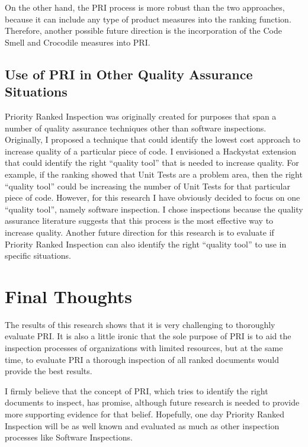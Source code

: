 On the other hand, the PRI process is more robust than the two approaches,
because it can include any type of product measures into the ranking
function. Therefore, another possible future direction is the incorporation
of the Code Smell and Crocodile measures into PRI.


\subsection{Use of PRI in Other Quality Assurance Situations}
Priority Ranked Inspection was originally created for purposes that span a
number of quality assurance techniques other than software inspections.
Originally, I proposed a technique that could identify the lowest cost
approach to increase quality of a particular piece of code. I envisioned a
Hackystat extension that could identify the right ``quality tool'' that is
needed to increase quality. For example, if the ranking showed that Unit
Tests are a problem area, then the right ``quality tool'' could be
increasing the number of Unit Tests for that particular piece of code.
However, for this research I have obviously decided to focus on one
``quality tool'', namely software inspection. I chose inspections because
the quality assurance literature suggests that this process is the most
effective way to increase quality. Another future direction for this
research is to evaluate if Priority Ranked Inspection can also identify the
right ``quality tool'' to use in specific situations.


\section{Final Thoughts}
The results of this research shows that it is very challenging to
thoroughly evaluate PRI. It is also a little ironic that the sole purpose
of PRI is to aid the inspection processes of organizations with limited
resources, but at the same time, to evaluate PRI a thorough inspection of
all ranked documents would provide the best results.

I firmly believe that the concept of PRI, which tries to identify the right
documents to inspect, has promise, although future research is needed to
provide more supporting evidence for that belief. Hopefully, one day
Priority Ranked Inspection will be as well known and evaluated as much as
other inspection processes like Software Inspections.






